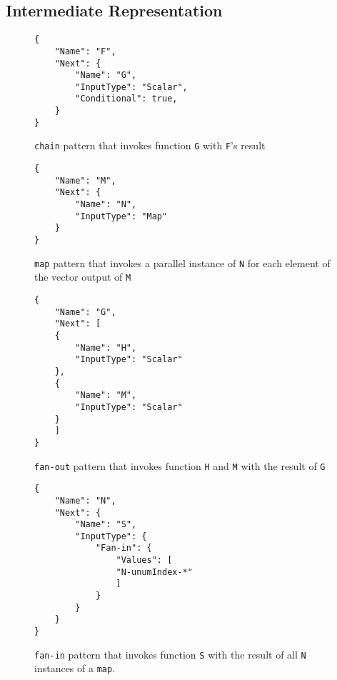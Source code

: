 \subsection{\name{} Intermediate Representation}\label{sec:ir}

\begin{figure*}[t!]
	\centering
	\begin{subfigure}[t]{\columnwidth}
		\centering
		\begin{verbatim}
{
	"Name": "F",
	"Next": {
		"Name": "G",
		"InputType": "Scalar",
		"Conditional": true,
	}
}
		\end{verbatim}
		\caption{\texttt{chain} pattern that invokes function \texttt{G} with
			\texttt{F}'s result}
		\label{fig:gadget-examples-chain}
	\end{subfigure}
	\begin{subfigure}[t]{\columnwidth}
		\centering
		\begin{verbatim}
{
	"Name": "M",
	"Next": {
		"Name": "N",
		"InputType": "Map"
	}
}
		\end{verbatim}
		\caption{\texttt{map} pattern that invokes a parallel instance of
			\texttt{N} for each element of the vector output of \texttt{M}}
		\label{fig:gadget-examples-map}
	\end{subfigure}
	\hfill
	\begin{subfigure}[t]{\columnwidth}
		\centering
		\begin{verbatim}
{
	"Name": "G",
	"Next": [
	{
		"Name": "H",
		"InputType": "Scalar"
	},
	{
		"Name": "M",
		"InputType": "Scalar"
	}
	]
}
		\end{verbatim}
		\caption{\texttt{fan-out} pattern that invokes function \texttt{H} and
			\texttt{M} with the result of \texttt{G}}
		\label{fig:gadget-examples-fanout}
	\end{subfigure}
	\begin{subfigure}[t]{\columnwidth}
		\centering
		\begin{verbatim}
{
	"Name": "N",
	"Next": {
		"Name": "S",
		"InputType": {
			"Fan-in": {
				"Values": [
				"N-unumIndex-*"
				]
			}
		}
	}
}
		\end{verbatim}
		\caption{\texttt{fan-in} pattern that invokes function \texttt{S} with
			the result of all \texttt{N} instances of a \texttt{map}.}
		\label{fig:gadget-examples-fanin}
	\end{subfigure}


\end{figure*}
